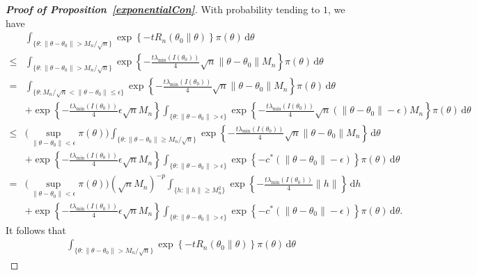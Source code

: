 \documentclass[11pt]{article}
\theoremstyle{plain}
\theoremstyle{definition}
\theoremstyle{remark}
\begin{document}
\begin{appendices}
\begin{proof}[\textbf{Proof of Proposition~\ref{exponentialCon}}]
    With probability tending to $1$, we have
$$
    \begin{aligned}
        &
\int_{\{\theta:\|\theta-\theta_0\|> M_n/\sqrt{n}\}} \exp\left\{ -t R_n (\theta_0 \| \theta) \right\} \pi(\theta) \, \mathrm d \theta
        \\
        \leq&
        \int_{\{\theta:\|\theta-\theta_0\|> M_n/\sqrt{n}\}} 
        \exp\left\{-\frac{t\lambda_{\min}(I(\theta_0))}{4}\sqrt{n}\|\theta-\theta_0\|M_n\right\}
        \pi(\theta)\, \mathrm d\theta
        \\
        =&
        \int_{\{\theta:M_n/\sqrt{n}< \|\theta-\theta_0\|\leq \epsilon \}} 
        \exp\left\{-\frac{t\lambda_{\min}(I(\theta_0))}{4}\sqrt{n}\|\theta-\theta_0\|M_n\right\}
        \pi(\theta)\, \mathrm d\theta
        \\
        &+
        \exp\left\{ 
            -\frac{t\lambda_{\min}(I(\theta_0))}{4}\epsilon\sqrt{n}M_n
        \right\}
        \int_{\{\theta:\|\theta-\theta_0\|> \epsilon\}} 
        \exp\left\{-\frac{t\lambda_{\min}(I(\theta_0))}{4}\sqrt{n} ( \|\theta-\theta_0\| - \epsilon ) M_n \right\}
        \pi(\theta)\, \mathrm d\theta
        \\
        \leq& 
        \big(\sup_{\|\theta-\theta_0\|<\epsilon}\pi(\theta)\big)
        \int_{\{\theta: \|\theta-\theta_0\|\geq M_n/\sqrt{n}\}} 
        \exp\left\{-\frac{t\lambda_{\min}(I(\theta_0))}{4}\sqrt{n}\|\theta-\theta_0\|M_n\right\}
        \, \mathrm d \theta
        \\
        &+
        \exp\left\{ 
            - \frac{ t \lambda_{\min}(I(\theta_0)) }{4} \epsilon\sqrt n M_n
        \right\}
        \int_{\{\theta:\|\theta-\theta_0\|> \epsilon\}} 
        \exp\left\{- c^* ( \|\theta-\theta_0\| - \epsilon ) \right\}
        \pi(\theta)\, \mathrm d\theta
        \\
        =& 
        \big(\sup_{\|\theta-\theta_0\|<\epsilon}\pi(\theta)\big)
        (\sqrt n M_n)^{-p}
        \int_{\{h: \|h\|\geq M_n^2 \}} 
        \exp\left\{-\frac{t\lambda_{\min}(I(\theta_0))}{4}\|h\| \right\}
        \, \mathrm d h
        \\
        &+
        \exp\left\{ 
            - \frac{ t \lambda_{\min}(I(\theta_0)) }{4} \epsilon\sqrt n M_n
        \right\}
        \int_{\{\theta:\|\theta-\theta_0\|> \epsilon\}} 
        \exp\left\{- c^* ( \|\theta-\theta_0\| - \epsilon ) \right\}
        \pi(\theta)\, \mathrm d\theta
        .
    \end{aligned}
$$
It follows that
\begin{align*}
\int_{\{\theta:\|\theta-\theta_0\|> M_n/\sqrt{n}\}} \exp\left\{ -t R_n (\theta_0 \| \theta) \right\} \pi(\theta) \, \mathrm d \theta

\end{align*}
\end{proof}
\end{appendices}
\end{document}
